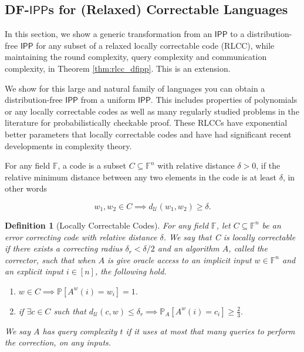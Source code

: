 \documentclass[11pt]{article}
\newtheorem{definition}{Definition}[section]
\newcommand{\IPP}{\mathsf{IPP}}
\newcommand{\F}{\mathbb{F}}
\newcommand{\sU}{\mathcal{U}}
\begin{document}
\subsection{DF-$\IPP$s for (Relaxed) Correctable Languages}
\label{sec:corr}


In this section, we show a generic transformation from an $\IPP$ to a distribution-free $\IPP$ for any subset of a relaxed locally correctable code (RLCC), while maintaining the round complexity, query complexity and communication complexity, in Theorem \ref{thm:rlcc_dfipp}. This is an extension.

We show for this large and natural family of languages you can obtain a distribution-free $\IPP$ from a uniform $\IPP$. This includes properties of polynomials or any locally correctable codes as well as many regularly studied problems in the literature for probabilistically checkable proof. These RLCCs have exponential better parameters that locally correctable codes and have had significant recent developments in complexity theory.

For any field $\F$, a code is a subset $C\subseteq\F^{n}$ with relative distance $\delta>0$, if the relative minimum distance between any two elements in the code is at least $\delta$, in other words

\begin{equation*}
    w_{1}, w_{2}\in C \implies d_{\mathcal{U}}(w_{1}, w_{2})\geq \delta.
\end{equation*}

\begin{definition}[Locally Correctable Codes]
For any field $\F$, let $C \subseteq \F^n$ be an error correcting code with relative distance $\delta$. 
We say that C is locally correctable if there exists a correcting radius $\delta_{r}< \delta/2$ and an algorithm $A$, called the \textit{corrector}, such that when $A$ is give oracle access to an implicit input $w\in \F^{n}$ and an explicit input $i \in [n]$, the following hold.
\begin{enumerate}
    \item $w\in C \implies \mathbb{P}[A^w(i)=w_{i}]=1$.
    \item if $\exists c\in C$ such that $d_{\sU}(c,w) \leq \delta_{r}\implies\mathbb{P}_A \left[ A^w(i)=c_{i} \right] \geq \frac{2}{3}.$

\end{enumerate}

We say $A$ has query complexity $t$ if it uses at most that many queries to perform the correction, on any inputs.
\end{definition}
\end{document}
